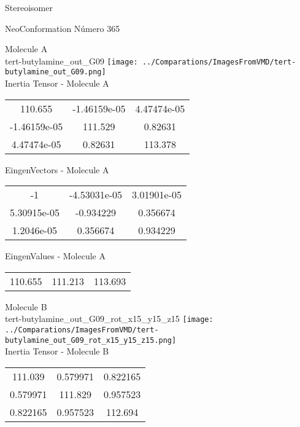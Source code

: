 \begin{center}
\vtab
\vtab
\textcolor{NavyBlue}{\Large Stereoisomer}
\end{center}

 \newpage

\vtab[-2cm]
\begin{center}
{\large NeoConformation \tab Número 365}
\end{center}
\begin{multicols}{2}
\begin{center}

Molecule A \\ 
tert-butylamine\_out\_G09
\texttt{[image: ../Comparations/ImagesFromVMD/tert-butylamine\_out\_G09.png]}
\\
Inertia Tensor - Molecule A \\
\vtab

\begin{tabular}{|c c c|}
110.655	 & 	-1.46159e-05	 & 	4.47474e-05	 \\
-1.46159e-05	 & 	111.529	 & 	0.82631	 \\
4.47474e-05	 & 	0.82631	 & 	113.378
\end{tabular}

\vtab
 EingenVectors - Molecule A     \\
\vtab
\begin{tabular}{|c c c|}
-1	 & 	-4.53031e-05	 & 	3.01901e-05	 \\
5.30915e-05	 & 	-0.934229	 & 	0.356674	 \\
1.2046e-05	 & 	0.356674	 & 	0.934229
\end{tabular}

\vtab
 EingenValues - Molecule A     \\
\vtab
\begin{tabular}{|c c c|}
110.655	 & 	111.213	 & 	113.693	 \\
\end{tabular}
\columnbreak

Molecule B \\ 
tert-butylamine\_out\_G09\_rot\_x15\_y15\_z15
\texttt{[image: ../Comparations/ImagesFromVMD/tert-butylamine\_out\_G09\_rot\_x15\_y15\_z15.png]}
\\
Inertia Tensor - Molecule B \\
\vtab

\begin{tabular}{|c c c|}
111.039	 & 	0.579971	 & 	0.822165	 \\
0.579971	 & 	111.829	 & 	0.957523	 \\
0.822165	 & 	0.957523	 & 	112.694
\end{tabular}


\end{center}
\end{multicols}
